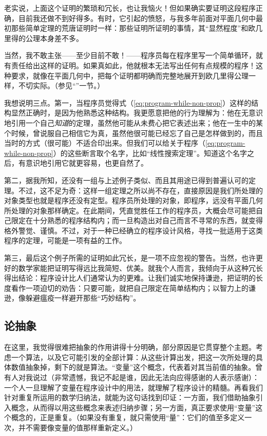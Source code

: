 老实说，上面这个证明的繁琐和冗长，也让我恼火！但如果确实要证明这段程序正确，目前我还做不到好得多。有时，它引起的愤怒，与我多年前面对平面几何中最初那些简单定理的荒唐证明时一样：那些证明所证明的事情，其“显然程度”和欧几里得的公理本身差不多。

当然，我不敢主张——至少目前不敢！——程序员每在程序里写一个简单循环，就有责任给出这样的证明。如果真如此，他就根本无法写出任何有点规模的程序！这种要求，就像在平面几何中，把每个证明都明确而完整地展开到欧几里得公理一样，不切实际。（参见“”一节。）

我想说明三点。第一，当程序员觉得式（\ref{eq:program-while-non-prop}）这样的结构显然正确时，是因为他熟悉这种结构。我更愿意把他的行为理解为：他在无意识地引用一个自己\textit{知道}的定理，虽然他可能从未费心把它表述出来；他在一生中的某个时候，曾说服自己相信它为真，虽然他很可能已经忘了自己是怎样做到的，而且当时的方式（很可能）不适合印出来。但我们可以给关于程序（\ref{eq:program-while-non-prop}）的这些断言取个名字，比如“线性搜索定理”。知道这个名字之后，有意识地引用它就更容易，也更自然了。

第二，据我所知，还没有一组与上述例子类似、而且其用途已得到普遍认可的定理。不过，这不足为奇：这样一组定理之所以尚不存在，直接原因是我们所处理的对象类型\textemdash{}也就是程序\textemdash{}还没有定型。程序员所处理的对象，即程序，远没有平面几何所处理的对象那样确定。在此期间，凭直觉胜任工作的程序员，大概会尽可能把自己限定在十分熟悉的程序结构内；而一旦构造出对自己而言不寻常的东西，就变得格外警觉、谨慎。不过，对于一种已经确立的程序设计风格，寻找一批适用于这类程序的定理，可能是一项有益的工作。

第三，最后这个例子所需的证明如此冗长，是一项不应忽视的警告。当然，也许更好的数学家能把证明写得远比我简短、优美。就我个人而言，我倾向于从这种冗长得出结论：程序设计比人们通常认为的更难。让我们诚实地保持谦逊，把证明的长度看作一项迫切的劝告：只要可能，就把自己限定在简单结构内；以智力上的谦逊，像躲避瘟疫一样避开那些“巧妙结构”。

\subsection{论抽象}

在这里，我觉得很难把抽象的作用讲得十分明确，部分原因是它贯穿整个主题。考虑一个算法，以及它可能引发的全部计算：从这些计算出发，把这一次所处理的具体数值抽象掉，剩下的就是算法。“变量”这个概念，代表着对其当前值的抽象。曾有人对我说过（非常遗憾，我记不起是谁，因此无法向应得感谢的人表示感谢）：一个人一旦理解了变量在程序设计中的用法，就理解了程序设计的精髓。再看我们针对重复所运用的数学归纳法，就能为这句话找到印证：一方面，我们借助抽象引入概念，从而得以用这些概念来表述归纳步骤；另一方面，真正要求使用“变量”这个概念的，正是重复。（如果没有重复，就只需使用“量”：它们的值至多定义一次，并不需要像变量的值那样重新定义。）

